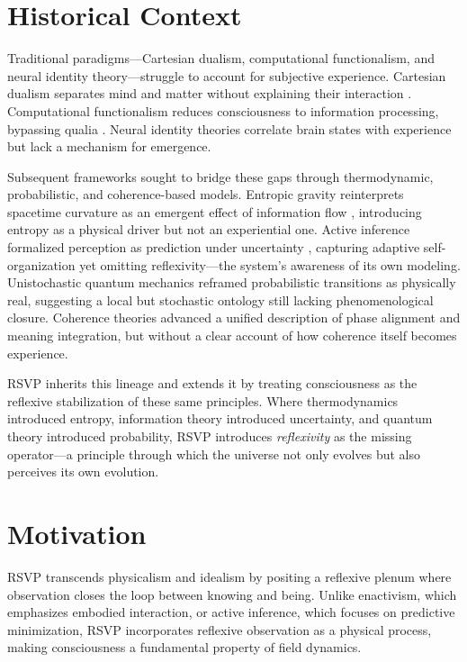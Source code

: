 \documentclass[12pt]{book}
\theoremstyle{definition}
\begin{document}
\section{Historical Context}
\label{sec:historical}
{\sloppy
Traditional paradigms---Cartesian dualism, computational functionalism, and neural identity theory---struggle to account for subjective experience.  
Cartesian dualism separates mind and matter without explaining their interaction \cite{descartes1641meditations}.  
Computational functionalism reduces consciousness to information processing, bypassing qualia \cite{chalmers1996conscious}.  
Neural identity theories correlate brain states with experience but lack a mechanism for emergence.  

Subsequent frameworks sought to bridge these gaps through thermodynamic, probabilistic, and coherence-based models.  
Entropic gravity reinterprets spacetime curvature as an emergent effect of information flow \cite{jacobson1995thermodynamics, verlinde2011origin, gibbs2025entropic}, introducing entropy as a physical driver but not an experiential one.  
Active inference formalized perception as prediction under uncertainty \cite{friston2023active, friston2025beautiful}, capturing adaptive self-organization yet omitting reflexivity---the system’s awareness of its own modeling.  
Unistochastic quantum mechanics \cite{barandes2024new, barandes2025unistochastic} reframed probabilistic transitions as physically real, suggesting a local but stochastic ontology still lacking phenomenological closure.  
Coherence theories \cite{logan2024unified, logan2025coherence} advanced a unified description of phase alignment and meaning integration, but without a clear account of how coherence itself becomes experience.  

RSVP inherits this lineage and extends it by treating consciousness as the reflexive stabilization of these same principles.  
Where thermodynamics introduced entropy, information theory introduced uncertainty, and quantum theory introduced probability, RSVP introduces \emph{reflexivity} as the missing operator---a principle through which the universe not only evolves but also perceives its own evolution.
}


\section{Motivation}
\label{sec:motivation}
RSVP transcends physicalism and idealism by positing a reflexive plenum where observation closes the loop between knowing and being. Unlike enactivism, which emphasizes embodied interaction, or active inference, which focuses on predictive minimization, RSVP incorporates reflexive observation as a physical process, making consciousness a fundamental property of field dynamics.
\end{document}
